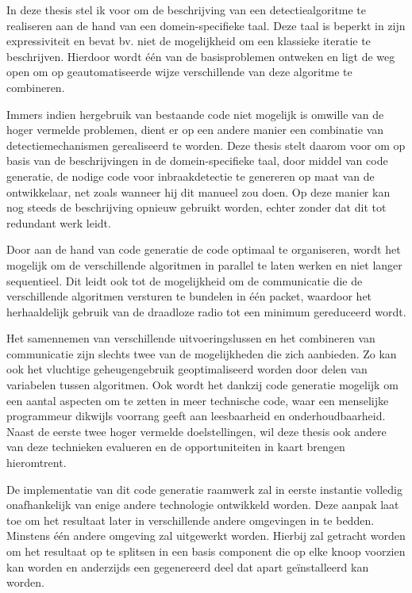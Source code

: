 \documentclass[12pt,a4paper,draft]{article}
\begin{document}
In deze thesis stel ik voor om de beschrijving van een detectiealgoritme te
realiseren aan de hand van een domein-specifieke taal. Deze taal is beperkt in
zijn expressiviteit en bevat bv. niet de mogelijkheid om een klassieke iteratie
te beschrijven. Hierdoor wordt \'e\'en van de basisproblemen ontweken en ligt
de weg open om op geautomatiseerde wijze verschillende van deze algoritme te
combineren.

Immers indien hergebruik van bestaande code niet mogelijk is omwille van de
hoger vermelde problemen, dient er op een andere manier een combinatie van
detectiemechanismen gerealiseerd te worden. Deze thesis stelt daarom voor om
op basis van de beschrijvingen in de domein-specifieke taal, door middel van
code generatie, de nodige code voor inbraakdetectie te genereren op maat van de
ontwikkelaar, net zoals wanneer hij dit manueel zou doen. Op deze manier kan
nog steeds de beschrijving opnieuw gebruikt worden, echter zonder dat dit tot
redundant werk leidt.

Door aan de hand van code generatie de code optimaal te organiseren, wordt het
mogelijk om de verschillende algoritmen in parallel te laten werken en niet
langer sequentieel. Dit leidt ook tot de mogelijkheid om de communicatie die de
verschillende algoritmen versturen te bundelen in \'e\'en packet, waardoor het
herhaaldelijk gebruik van de draadloze radio tot een minimum gereduceerd wordt.

Het samennemen van verschillende uitvoeringslussen en het combineren van
communicatie zijn slechts twee van de mogelijkheden die zich aanbieden. Zo kan
ook het vluchtige geheugengebruik geoptimaliseerd worden door delen van
variabelen tussen algoritmen. Ook wordt het dankzij code generatie mogelijk om
een aantal aspecten om te zetten in meer technische code, waar een menselijke
programmeur dikwijls voorrang geeft aan leesbaarheid en onderhoudbaarheid.
Naast de eerste twee hoger vermelde doelstellingen, wil deze thesis ook andere
van deze technieken evalueren en de opportuniteiten in kaart brengen
hieromtrent.

De implementatie van dit code generatie raamwerk zal in eerste instantie
volledig onafhankelijk van enige andere technologie ontwikkeld worden. Deze
aanpak laat toe om het resultaat later in verschillende andere omgevingen in te
bedden. Minstens \'e\'en andere omgeving zal uitgewerkt worden. Hierbij zal
getracht worden om het resultaat op te splitsen in een basis component die op
elke knoop voorzien kan worden en anderzijds een gegenereerd deel dat apart
ge\"installeerd kan worden.
\end{document}
